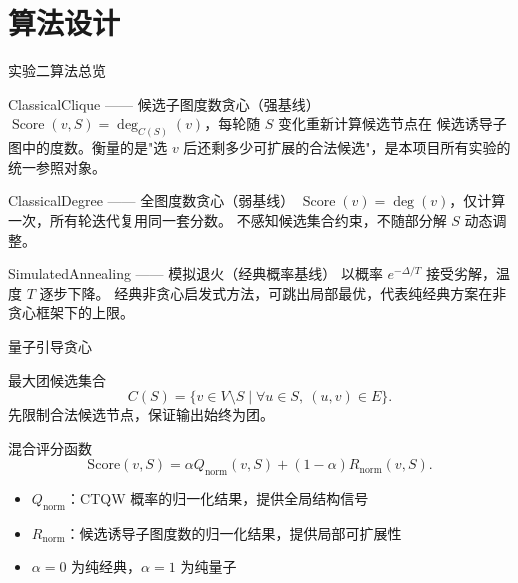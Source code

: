 \documentclass[aspectratio=169,10pt]{ctexbeamer}
\newcommand{\score}{\mathrm{Score}}
\newcommand{\qscore}{Q_{\mathrm{norm}}}
\newcommand{\rscore}{R_{\mathrm{norm}}}
\begin{document}
\section{算法设计}

\begin{frame}{实验二算法总览}
  \begin{alertblock}{ClassicalClique —— 候选子图度数贪心（强基线）}
    $\operatorname{Score}(v,S)=\deg_{C(S)}(v)$，每轮随 $S$ 变化重新计算候选节点在
    候选诱导子图中的度数。衡量的是"选 $v$ 后还剩多少可扩展的合法候选"，是本项目所有实验的统一参照对象。
  \end{alertblock}

  \vspace{0.15em}

  \begin{block}{ClassicalDegree —— 全图度数贪心（弱基线）}
    $\operatorname{Score}(v)=\deg(v)$，仅计算一次，所有轮迭代复用同一套分数。
    不感知候选集合约束，不随部分解 $S$ 动态调整。
  \end{block}

  \vspace{0.15em}

  \begin{block}{SimulatedAnnealing —— 模拟退火（经典概率基线）}
    以概率 $e^{-\Delta/T}$ 接受劣解，温度 $T$ 逐步下降。
    经典非贪心启发式方法，可跳出局部最优，代表纯经典方案在非贪心框架下的上限。
  \end{block}
\end{frame}

\begin{frame}{量子引导贪心}
  \begin{block}{最大团候选集合}
    \[
      C(S)=\{v\in V\setminus S\mid \forall u\in S,\ (u,v)\in E\}.
    \]
    先限制合法候选节点，保证输出始终为团。
  \end{block}

  \vspace{0.6em}
  \begin{block}{混合评分函数}
    \[
      \score(v,S)=\alpha \qscore(v,S)+(1-\alpha)\rscore(v,S).
    \]
  \end{block}

  \begin{itemize}
    \item $\qscore$：CTQW 概率的归一化结果，提供全局结构信号
    \item $\rscore$：候选诱导子图度数的归一化结果，提供局部可扩展性
    \item $\alpha=0$ 为纯经典，$\alpha=1$ 为纯量子
  \end{itemize}
\end{frame}
\end{document}
